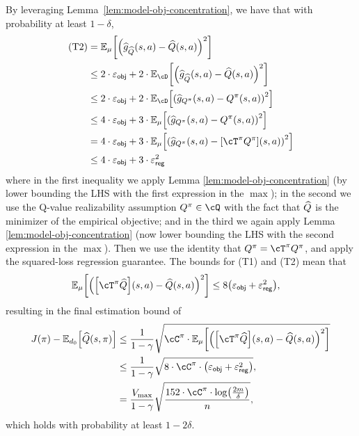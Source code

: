 By leveraging Lemma~\ref{lem:model-obj-concentration}, we have that with probability at least $1-\delta$,
\begin{align}
  \mathrm{(T 2)}
  & = \En_{\data}\sbr*{\rbr*{\ghat(s,a) - \Qhat(s,a)}^2}
  \\
  & \le 2\cdot\vepsobj + 2\cdot\En_{\cD}\sbr*{\rbr*{\ghat[\Qhat](s,a) - \Qhat(s,a)}^2}  
  \\
  & \le 2\cdot\vepsobj + 2\cdot\En_{\cD}\sbr*{\rbr*{\ghat[\Qpi](s,a) - \Qpi(s,a)}^2}
  \\
  & \le 4\cdot\vepsobj + 3\cdot\En_{\mu}\sbr*{\rbr*{\ghat[\Qpi](s,a) - \Qpi(s,a)}^2}
  \\
  & = 4\cdot\vepsobj + 3\cdot\En_{\mu}\sbr*{\rbr*{\ghat[\Qpi](s,a) - [\Tpi\Qpi](s,a)}^2}
  \\
  & \le 4\cdot\vepsobj + 3\cdot\vepssqs
\end{align}
where in the first inequality we apply Lemma \ref{lem:model-obj-concentration}
(by lower bounding the LHS with the first expression in the $\max$); 
in the second we use the Q-value realizability assumption $\Qpi \in \cQ$
with the fact that $\widehat{Q}$ is the minimizer of the empirical objective; 
and in the third we again apply Lemma \ref{lem:model-obj-concentration}
(now lower bounding the LHS with the second expression in the $\max$).
Then we use the identity that $\Qpi = \Tpi\Qpi$,
and apply the squared-loss regression guarantee. 
The bounds for (T1) and (T2) mean that
\begin{align}
  \En_{\data}\sbr*{\rbr*{\sbr*{\Tpi\Qhat}(s,a) - \Qhat(s,a)}^2}
  & \le 8\rbr*{\vepsobj + \vepssqs}, 
\end{align}
resulting in the final estimation bound of 
\begin{align}
 J(\pi) - \En_{d_{0}}\sbr*{\Qhat(s,\pi)} 
 & \le  \frac{1}{1-\gamma} \sqrt{\Cone\cdot\En_{\data}\sbr*{\rbr*{\sbr*{\Tpi\Qhat}(s,a) - \Qhat(s,a)}^2}} 
 \\
 & \le  \frac{1}{1-\gamma} \sqrt{8\cdot\Cone\cdot\rbr*{\vepsobj + \vepssqs}},
 \\
 & = \frac{\Vmax}{1-\gamma} \sqrt{\frac{152\cdot\Cone\cdot\log\rbr*{\frac{2m}{\delta} }}{n}},
\end{align}
which holds with probability at least $1-2\delta$.


